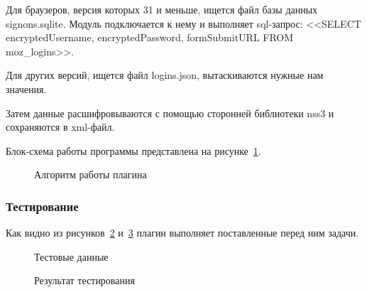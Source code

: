 Для браузеров, версия которых 31 и меньше, ищется файл базы данных signons.sqlite. Модуль подключается к нему и выполняет sql-запрос: <<SELECT encryptedUsername, encryptedPassword, formSubmitURL FROM moz\_logins>>.

Для других версий, ищется файл logins.json, вытаскиваются нужные нам значения.

Затем данные расшифровываются с помощью сторонней библиотеки nss3 и сохраняются в xml-файл.

Блок-схема работы программы представлена на рисунке~\ref{teresh_2:teresh_2}.

\begin{figure}[h!]
\caption{Алгоритм работы плагина}
\label{teresh_2:teresh_2}
\end{figure}

\subsubsection{Тестирование}

Как видно из рисунков~\ref{teresh_3:teresh_3} и~\ref{teresh_4:teresh_4} плагин выполняет поставленные перед ним задачи.

\begin{figure}[h!]
\caption{Тестовые данные}
\label{teresh_3:teresh_3}
\end{figure}

\begin{figure}[h!]
\caption{Результат тестирования}
\label{teresh_4:teresh_4}
\end{figure}

\clearpage
